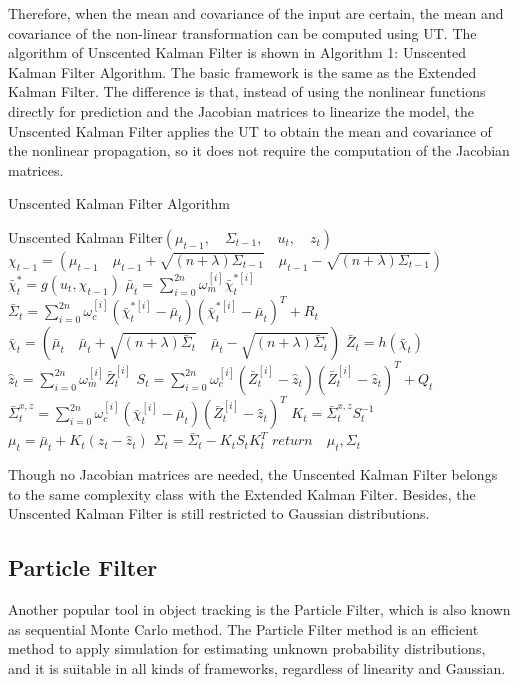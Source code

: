 \documentclass[10pt,twocolumn,letterpaper]{article}
\begin{document}
Therefore, when the mean and covariance of the input are certain, the mean and covariance of the non-linear transformation can be computed using UT. The algorithm of Unscented Kalman Filter is shown in Algorithm 1: Unscented Kalman Filter Algorithm. The basic framework is the same as the Extended Kalman Filter. The difference is that, instead of using the nonlinear functions directly for prediction and the Jacobian matrices to linearize the model, the Unscented Kalman Filter applies the UT to obtain the mean and covariance of the nonlinear propagation\cite{ref:gustafsson}, so it does not require the computation of the Jacobian matrices.
\begin{algorithm}
\caption {Unscented Kalman Filter Algorithm}
\begin{algorithmic} [1]
\State  Unscented Kalman Filter$(\mu_{t-1},\quad \Sigma_{t-1},\quad u_t,\quad z_t)$
\State $\chi_{t-1}=(\mu_{t-1} \quad \mu_{t-1}+\sqrt{(n+\lambda)\Sigma_{t-1}} \quad \mu_{t-1}-\sqrt{(n+\lambda)\Sigma_{t-1}})$
\State $\bar\chi_t^*=g(u_t,\chi_{t-1})$
\State $\bar\mu_t=\sum_{i=0}^{2n} \omega_m^{[i]}\bar\chi_t^{*[i]}$
\State $\bar\Sigma_t=\sum_{i=0}^{2n} \omega_c^{[i]}(\bar\chi_t^{*[i]}-\bar\mu_t)(\bar\chi_t^{*[i]}-\bar\mu_t)^T+R_t$
\State $\bar\chi_t=(\bar\mu_t\quad \bar\mu_t+\sqrt{(n+\lambda)\bar\Sigma_t}\quad \bar\mu_t-\sqrt{(n+\lambda)\bar\Sigma_t})$
\State $\bar{Z}_t=h(\bar\chi_t)$
\State $\hat{z}_t=\sum_{i=0}^{2n} \omega_m^{[i]}\bar{Z}_t^{[i]}$
\State $S_t=\sum_{i=0}^{2n}  \omega_c^{[i]} (\bar{Z}_t^{[i]}-\hat{z}_t) (\bar{Z}_t^{[i]}-\hat{z}_t)^T+Q_t$
\State $\bar\Sigma_t^{x,z}=\sum_{i=0}^{2n} \omega_c^{[i]}(\bar\chi_t^{[i]}-\bar\mu_t)(\bar{Z}_t^{[i]}-\hat{z}_t)^T$
\State $K_t=\bar\Sigma_t^{x,z}S_t^{-1}$
\State $\mu_t=\bar\mu_t+K_t(z_t-\hat{z}_t)$
\State $\Sigma_t=\bar\Sigma_t-K_tS_tK_t^T$
\State $return\quad \mu_t,\Sigma_t$
\end{algorithmic}
\end{algorithm}

Though no Jacobian matrices are needed, the Unscented Kalman Filter belongs to the same complexity class with the Extended Kalman Filter. Besides, the Unscented Kalman Filter is still restricted to Gaussian distributions.

\subsection{Particle Filter}

Another popular tool in object tracking is the Particle Filter\cite{ref:gordon}, which is also known as sequential Monte Carlo method\cite{ref:robert}. The Particle Filter method is an efficient method to apply simulation for estimating unknown probability distributions, and it is suitable in all kinds of frameworks, regardless of linearity and Gaussian. 
\end{document}
